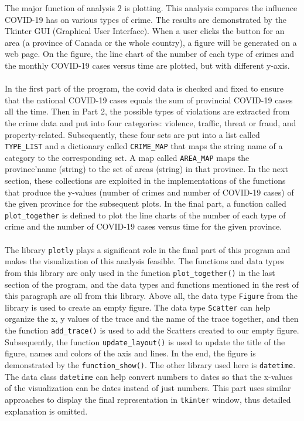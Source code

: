 \documentclass[fontsize=11pt]{article}
\begin{document}
\begin{enumerate}
The major function of analysis 2 is plotting. This analysis compares the influence COVID-19 has on various types of crime. The results are demonstrated by the Tkinter GUI (Graphical User Interface). When a user clicks the button for an area (a province of Canada or the whole country), a figure will be generated on a web page. On the figure, the line chart of the number of each type of crimes and the monthly COVID-19 cases versus time are plotted, but with different y-axis.
\\
\\
In the first part of the program, the covid data is checked and fixed to ensure that the national COVID-19 cases equals the sum of provincial COVID-19 cases all the time. Then in Part 2, the possible types of violations are extracted from the crime data and put into four categories: violence, traffic, threat or fraud, and property-related. Subsequently, these four sets are put into a list called \texttt{TYPE\_LIST} and a dictionary called \texttt{CRIME\_MAP} that maps the string name of a category to the corresponding set. A map called \texttt{AREA\_MAP} maps the province’name (string) to the set of areas (string) in that province. In the next section, these collections are exploited in the implementations of the functions that produce the y-values (number of crimes and number of COVID-19 cases) of the given province for the subsequent plots. In the final part, a function called \texttt{plot\_together} is defined to plot the line charts of the number of each type of crime and the number of COVID-19 cases versus time for the given province.
\\
\\
The library \texttt{plotly} plays a significant role in the final part of this program and makes the visualization of this analysis feasible. The functions and data types from this library are only used in the function \texttt{plot\_together()} in the last section of the program, and the data types and functions mentioned in the rest of this paragraph are all from this library. Above all, the data type \texttt{Figure} from the library is used to create an empty figure. The data type \texttt{Scatter} can help organize the x, y values of the trace and the name of the trace together, and then the function \texttt{add\_trace()} is used to add the Scatters created to our empty figure. Subsequently, the function \texttt{update\_layout()} is used to update the title of the figure, names and colors of the axis and lines. In the end, the figure is demonstrated by the \texttt{function\_show()}. The other library used here is \texttt{datetime}. The data class \texttt{datetime} can help convert numbers to dates so that the x-values of the visualization can be dates instead of just numbers. This part uses similar approaches to display the final representation in \texttt{tkinter} window, thus detailed explanation is omitted.


\end{enumerate}
\end{document}

